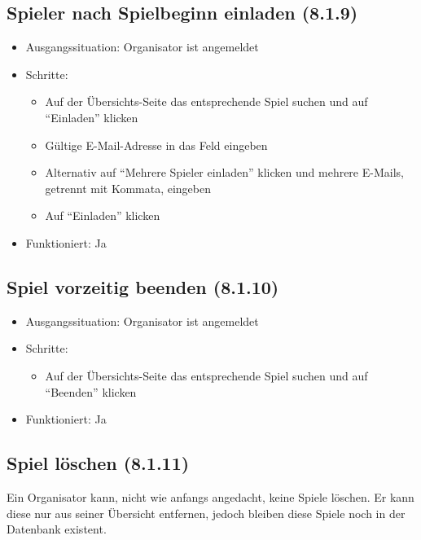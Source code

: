 \documentclass[a4paper]{scrreprt}
\begin{document}
            \subsection{Spieler nach Spielbeginn einladen (8.1.9)}
            \begin{itemize}
                \item Ausgangssituation: Organisator ist angemeldet
                \item Schritte:
                    \begin{itemize}
                        \item Auf der Übersichts-Seite das entsprechende Spiel suchen und auf \enquote{Einladen} klicken
                        \item Gültige E-Mail-Adresse in das Feld eingeben
                        \item Alternativ auf \enquote{Mehrere Spieler einladen} klicken und mehrere E-Mails, getrennt mit Kommata, eingeben
                        \item Auf \enquote{Einladen} klicken
                    \end{itemize}
                \item Funktioniert: Ja
            \end{itemize}

            \subsection{Spiel vorzeitig beenden (8.1.10)}
            \begin{itemize}
                \item Ausgangssituation: Organisator ist angemeldet
                \item Schritte:
                    \begin{itemize}
                        \item Auf der Übersichts-Seite das entsprechende Spiel suchen und auf \enquote{Beenden} klicken
                \end{itemize}
                \item Funktioniert: Ja
            \end{itemize}

            \subsection{Spiel löschen (8.1.11)}
            Ein Organisator kann, nicht wie anfangs angedacht, keine Spiele löschen. Er kann diese nur aus seiner Übersicht entfernen, jedoch bleiben diese Spiele noch in der Datenbank existent.
\end{document}
